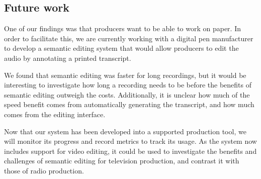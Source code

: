 \subsection{Future work}\label{sec:screen-future}
One of our findings was that producers want to be able to work on paper. In order to facilitate this, we are currently
working with a digital pen manufacturer to develop a semantic editing system that would allow producers to edit the
audio by annotating a printed transcript. 


We found that semantic editing was faster for long recordings, but it would be interesting to investigate how long a
recording needs to be before the benefits of semantic editing outweigh the costs. Additionally, it is unclear how much
of the speed benefit comes from automatically generating the transcript, and how much comes from the editing interface.



Now that our system has been developed into a supported production tool, we will monitor its progress and record
metrics to track its usage. As the system now includes support for video editing, it could be used to investigate the
benefits and challenges of semantic editing for television production, and contrast it with those of radio production.



